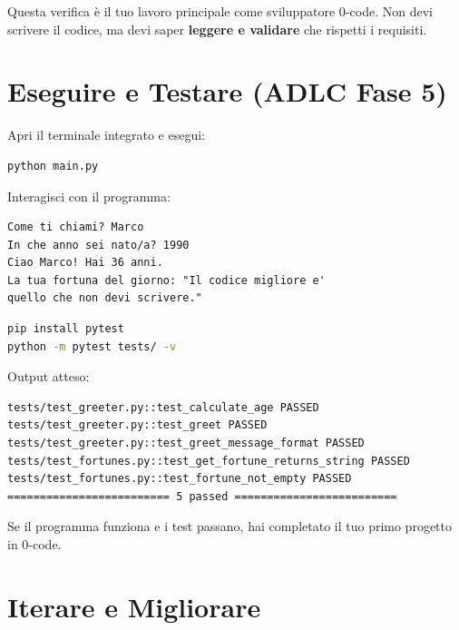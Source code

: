 \begin{tipbox}
Questa verifica è il tuo lavoro principale come sviluppatore 0-code. Non devi scrivere il codice, ma devi saper \textbf{leggere e validare} che rispetti i requisiti.
\end{tipbox}

\section{Eseguire e Testare (ADLC Fase 5)}

\begin{praticabox}[title={Pratica --- Esecuzione del programma}]
Apri il terminale integrato e esegui:
\begin{lstlisting}[language=bash]
python main.py
\end{lstlisting}
Interagisci con il programma:
\begin{lstlisting}[language={}]
Come ti chiami? Marco
In che anno sei nato/a? 1990
Ciao Marco! Hai 36 anni.
La tua fortuna del giorno: "Il codice migliore e'
quello che non devi scrivere."
\end{lstlisting}
\end{praticabox}

\begin{praticabox}[title={Pratica --- Esecuzione dei test}]
\begin{lstlisting}[language=bash]
pip install pytest
python -m pytest tests/ -v
\end{lstlisting}
Output atteso:
\begin{lstlisting}[language={}]
tests/test_greeter.py::test_calculate_age PASSED
tests/test_greeter.py::test_greet PASSED
tests/test_greeter.py::test_greet_message_format PASSED
tests/test_fortunes.py::test_get_fortune_returns_string PASSED
tests/test_fortunes.py::test_fortune_not_empty PASSED
========================= 5 passed =========================
\end{lstlisting}
\end{praticabox}

\begin{checkpointbox}
Se il programma funziona e i test passano, hai completato il tuo primo progetto in 0-code.
\end{checkpointbox}

\section{Iterare e Migliorare}

